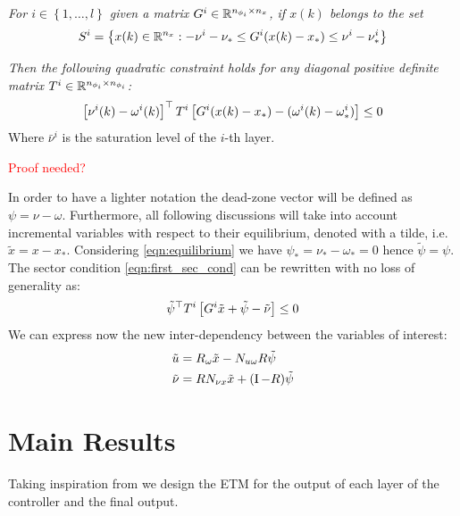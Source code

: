 \documentclass{ifacconf}
\theoremstyle{plain}
\begin{document}
\emph{For $i \in \left\{ 1, \dots, l \right\}$ given a matrix $G^i \in {\mathbb{R}}^{n_{\phi_i} \times n_x}$, if $x(k)$ belongs to the set}
$$
S^i = \left\{ x(k) \in {\mathbb{R}}^{n_x} : -\relax{\nu}^i - \relax{\nu}_* \leq G^i (x(k) - x_*) \leq \relax{\nu}^i - \nu_*^i \right\} 
$$

\emph{Then the following quadratic constraint holds for any diagonal positive definite matrix $T^i \in {\mathbb{R}}^{n_{\phi_i} \times n_{\phi_i}}$:}
\begin{equation}\label{eqn:first_sec_cond}
  \left[ \nu^i(k) - \omega^i(k) \right]^\top T^i \left[ G^i (x(k) - x_*) - (\omega^i(k) - \omega^i_*) \right] \leq 0
\end{equation}
Where $\bar{\nu}^i$ is the saturation level of the $i$-th layer.

\textcolor{red}{Proof needed?}

In order to have a lighter notation the dead-zone vector  will be defined as $\psi = \nu - \omega$. Furthermore, all following discussions will take into account incremental variables with respect to their equilibrium, denoted with a tilde, i.e. $\tilde{x} = x - x_*$. Considering \eqref{eqn:equilibrium} we have $\psi_* = \nu_* - \omega_* = 0$ hence $\tilde{\psi} = \psi$. The sector condition \eqref{eqn:first_sec_cond} can be rewritten with no loss of generality as:
\begin{equation}\label{eqn:sec_cond}
  \tilde{\psi}^\top T^i \left[ G^i \tilde{x} + \tilde{\psi} - \tilde{\nu} \right] \leq 0
\end{equation}
We can express now the new inter-dependency between the variables of interest:
\begin{equation}\label{eqn:incremental}
  \begin{aligned}
    \tilde{u} &= R_{\omega} \tilde{x} - N_{u \omega} R \tilde{\psi}\\
    \tilde{\nu} &= R N_{\nu x} \tilde{x} + (\operatorname{I} - R) \tilde{\psi}
  \end{aligned}
\end{equation}

\section{Main Results}

Taking inspiration from \citep[Proposition 1, Lemma 3]{css-extended} we design the ETM for the output of each layer of the controller and the final output.
\end{document}
